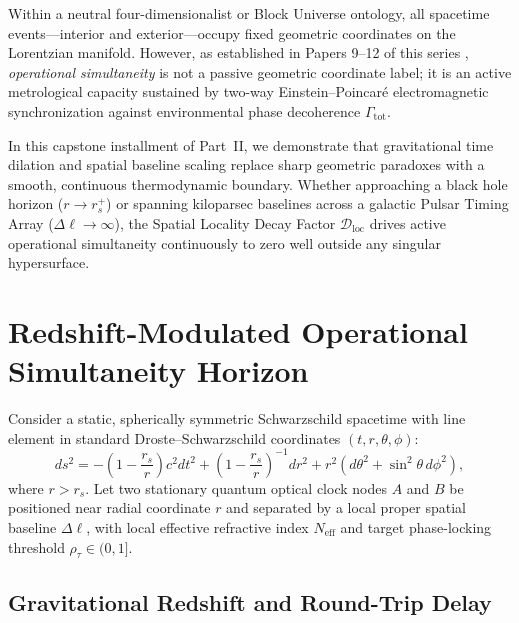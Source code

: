 \documentclass[11pt,a4paper]{article}
\begin{document}
Within a neutral four-dimensionalist or Block Universe ontology, all spacetime events—interior and exterior—occupy fixed geometric coordinates on the Lorentzian manifold. However, as established in Papers 9--12 of this series \cite{damasio_compendium}, \textit{operational simultaneity} is not a passive geometric coordinate label; it is an active metrological capacity sustained by two-way Einstein--Poincaré electromagnetic synchronization against environmental phase decoherence $\Gamma_{\mathrm{tot}}$.

In this capstone installment of Part~II, we demonstrate that gravitational time dilation and spatial baseline scaling replace sharp geometric paradoxes with a smooth, continuous thermodynamic boundary. Whether approaching a black hole horizon ($r \to r_s^+$) or spanning kiloparsec baselines across a galactic Pulsar Timing Array ($\Delta\ell \to \infty$), the Spatial Locality Decay Factor $\mathcal{D}_{\mathrm{loc}}$ drives active operational simultaneity continuously to zero well outside any singular hypersurface.

\section{Redshift-Modulated Operational Simultaneity Horizon}

Consider a static, spherically symmetric Schwarzschild spacetime with line element in standard Droste--Schwarzschild coordinates $(t, r, \theta, \phi)$:
\begin{equation}
ds^2 = -\left(1 - \frac{r_s}{r}\right) c^2 dt^2 + \left(1 - \frac{r_s}{r}\right)^{-1} dr^2 + r^2 \left(d\theta^2 + \sin^2\theta\, d\phi^2\right),
\end{equation}
where $r > r_s$. Let two stationary quantum optical clock nodes $A$ and $B$ be positioned near radial coordinate $r$ and separated by a local proper spatial baseline $\Delta\ell$, with local effective refractive index $N_{\mathrm{eff}}$ and target phase-locking threshold $\rho_\tau \in (0, 1]$.

\subsection{Gravitational Redshift and Round-Trip Delay}
\end{document}
